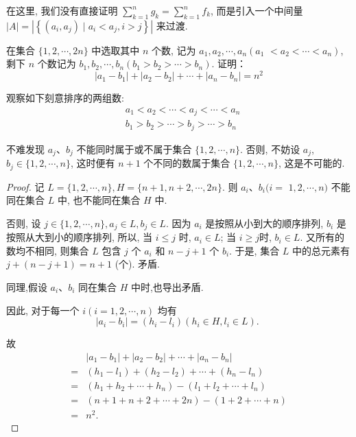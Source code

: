 \begin{note}
	在这里, 我们没有直接证明 $\sum_{k=1}^{n} g_{k}=\sum_{k=1}^{n} f_{k}$, 而是引入一个中间量 $|A|=\left|\left\{\left(a_{i}, a_{j}\right) \mid a_{i}<a_{j}, i>j\right\}\right|$ 来过渡.
\end{note}

\begin{example}
	在集合 $\{1,2, \cdots, 2 n\}$ 中选取其中 $n$ 个数, 记为 $a_{1}, a_{2}, \cdots, a_{n}\left(a_{1}\right.$ $\left.<a_{2}<\cdots<a_{n}\right)$, 剩下 $n$ 个数记为 $b_{1}, b_{2}, \cdots, b_{n}\left(b_{1}>b_{2}>\cdots>b_{n}\right)$. 证明：
	$$
		\left|a_{1}-b_{1}\right|+\left|a_{2}-b_{2}\right|+\cdots+\left|a_{n}-b_{n}\right|=n^{2}
	$$
\end{example}

\begin{analysis}
	观察如下刻意排序的两组数:
	$$
		\begin{aligned}
			 & a_{1}<a_{2}<\cdots<a_{j}<\cdots<a_{n} \\
			 & b_{1}>b_{2}>\cdots>b_{j}>\cdots>b_{n}
		\end{aligned}
	$$

	不难发现 $a_{j} 、 b_{j}$ 不能同时属于或不属于集合 $\{1,2, \cdots, n\}$. 否则, 不妨设 $a_{j}$, $b_{j} \in\{1,2, \cdots, n\}$, 这时便有 $n+1$ 个不同的数属于集合 $\{1,2, \cdots, n\}$, 这是不可能的.
\end{analysis}

\begin{proof}
	记 $L=\{1,2, \cdots, n\}, H=\{n+1, n+2, \cdots, 2 n\}$. 则 $a_{i} 、 b_{i}(i=$ $1,2, \cdots, n)$ 不能同在集合 $L$ 中, 也不能同在集合 $H$ 中.

	否则, 设 $j \in\{1,2, \cdots, n\}, a_{j} \in L, b_{j} \in L$. 因为 $a_{i}$ 是按照从小到大的顺序排列, $b_{i}$ 是按照从大到小的顺序排列, 所以, 当 $i \leqslant j$ 时, $a_{i} \in L$; 当 $i \geqslant j$时, $b_{i} \in L$. 又所有的数均不相同, 则集合 $L$ 包含 $j$ 个 $a_{i}$ 和 $n-j+1$ 个 $b_{i}$. 于是, 集合 $L$ 中的总元素有 $j+(n-j+1)=n+1$ (个). 矛盾.

	同理,假设 $a_{i} 、 b_{i}$ 同在集合 $H$ 中时,也导出矛盾.

	因此, 对于每一个 $i(i=1,2, \cdots, n)$ 均有
	$$
		\left|a_{i}-b_{i}\right|=\left(h_{i}-l_{i}\right)\left(h_{i} \in H, l_{i} \in L\right) \text {. }
	$$

	故
	$$
		\begin{aligned}
			  & \left|a_{1}-b_{1}\right|+\left|a_{2}-b_{2}\right|+\cdots+\left|a_{n}-b_{n}\right| \\
			= & \left(h_{1}-l_{1}\right)+\left(h_{2}-l_{2}\right)+\cdots+\left(h_{n}-l_{n}\right) \\
			= & \left(h_{1}+h_{2}+\cdots+h_{n}\right)-\left(l_{1}+l_{2}+\cdots+l_{n}\right)       \\
			= & (n+1+n+2+\cdots+2 n)-(1+2+\cdots+n)                                               \\
			= & n^{2} .
		\end{aligned}
	$$
\end{proof}


